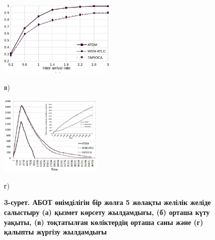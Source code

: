 \begin{figure}[H]
    \begin{minipage}[b]{0.45\textwidth}
        \centering
        \includegraphics[width=\textwidth]{assets/163}
        \caption*{в)}
    \end{minipage}
    \hspace{0.05\textwidth}
    \begin{minipage}[b]{0.45\textwidth}
        \centering
        \includegraphics[width=\textwidth]{assets/164}
        \caption*{г)}
    \end{minipage}
\caption*{\bfseries 3-сурет. АБОТ өнімділігін бір жолға 5 жолақты желілік желіде
салыстыру (а) қызмет көрсету жылдамдығы, (б) орташа күту уақыты, (в)
тоқтатылған көліктердің орташа саны және (г) қалыпты жүргізу жылдамдығы }
\end{figure}


